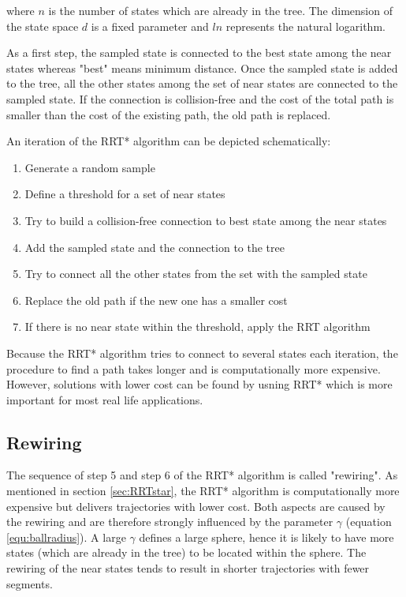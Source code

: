 where $n$ is the number of states which are already in the tree. The dimension of the state space $d$ is a fixed parameter and $ln$ represents the natural logarithm.\newline


As a first step, the sampled state is connected to the best state among the near states whereas "best" means minimum distance. Once the sampled state is added to the tree, all the other states among the set of near states are connected to the sampled state. If the connection is collision-free and the cost of the total path is smaller than the cost of the existing path, the old path is replaced. \newline

An iteration of the RRT* algorithm can be depicted schematically:


\begin{enumerate}
  \item Generate a random sample
  \item Define a threshold for a set of near states
  \item Try to build a collision-free connection to best state among the near states
  \item Add the sampled state and the connection to the tree 
  \item Try to connect all the other states from the set with the sampled state 
  \item Replace the old path if the new one has a smaller cost
  \item If there is no near state within the threshold, apply the RRT algorithm
\end{enumerate}


Because the RRT* algorithm tries to connect to several states each iteration, the procedure to find a path takes longer and is computationally more expensive. However, solutions with lower cost can be found by usning RRT* which is more important for most real life applications.

\subsection{Rewiring}\label{sec:Rewiring}


The sequence of step 5 and step 6 of the RRT* algorithm is called "rewiring".  As mentioned in section \ref{sec:RRTstar}, the RRT* algorithm is computationally more expensive but delivers trajectories with lower cost. Both aspects are caused by the rewiring and are therefore strongly influenced by the parameter $\gamma$ (equation \ref{equ:ballradius}). A large $\gamma$ defines a large sphere, hence it is likely to have more states (which are already in the tree) to be located within the sphere. The rewiring of the near states tends to result in shorter trajectories with fewer segments.\newline

